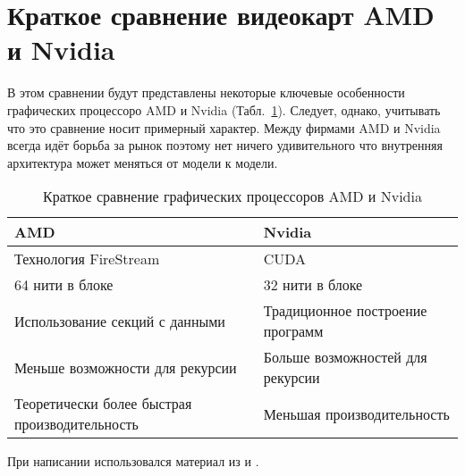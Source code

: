 \section{Краткое сравнение видеокарт AMD и Nvidia}

В этом сравнении будут представлены некоторые ключевые особенности графических процессоро AMD и Nvidia (Табл.~\ref{table:compare}). Следует, однако, учитывать что это сравнение носит примерный характер. Между фирмами AMD и Nvidia всегда идёт борьба за рынок поэтому нет ничего удивительного что внутренняя архитектура может меняться от модели к модели.

\begin{table}
\begin{center}
\begin{tabular}{|p{5cm}|p{5cm}|}
\hline
AMD & Nvidia \\ \hline
Технология FireStream & CUDA \\ \hline
64 нити в блоке & 32 нити в блоке \\ \hline
Использование секций с данными & Традиционное построение программ \\ \hline
Меньше возможности для рекурсии & Больше возможностей для рекурсии \\ \hline
Теоретически более быстрая производительность & Меньшая производительность \\ 
\hline
\end{tabular}
\end{center}
\caption{Краткое сравнение графических процессоров AMD и Nvidia}
\label{table:compare}
\end{table}

При написании использовался материал из \cite{nvidiacuda} и \cite{amd}.
